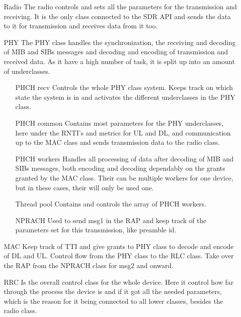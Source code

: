 \begin{itemize}
\item [Radio] The radio controls and sets all the parameters for the transmission and receiving. It is the only class connected to the SDR API and sends the data to it for transmission and receives data from it too. 
\item [PHY] The PHY class handles the synchronization, the receiving and decoding of MIB and SIBs messages and decoding and encoding of transmission and received data. As it have a high number of task, it is split up into an amount of underclasses.
	\begin{itemize}
	\item [PHCH recv] Controls the whole PHY class system. Keeps track on which state the system is in and activates the different underclasses in the PHY class.
	\item [PHCH common] Contains most parameters for the PHY underclasses, here under the RNTI's and metrics for UL and DL, and communication up to the MAC class and sends transmission data to the radio class.
	\item [PHCH workers] Handles all processing of data after decoding of MIB and SIBs messages, both encoding and decoding dependably on the grants granted by the MAC class. Their can be multiple workers for one device, but in these cases, their will only be used one.
	\item [Thread pool] Contains and controls the array of PHCH workers.	
	\item [NPRACH] Used to send msg1 in the RAP and keep track of the parameters set for this transmission, like preamble id.
	\end{itemize}
\item [MAC] Keep track of TTI and give grants to PHY class to decode and encode of DL and UL. Control flow from the PHY class to the RLC class. Take over the RAP from the NPRACH class for msg2 and onward.
\item [RRC] Is the overall control class for the whole device. Here it control how far through the process the device is and if it got all the needed parameters, which is the reason for it being connected to all lower classes, besides the radio class.
\end{itemize}

